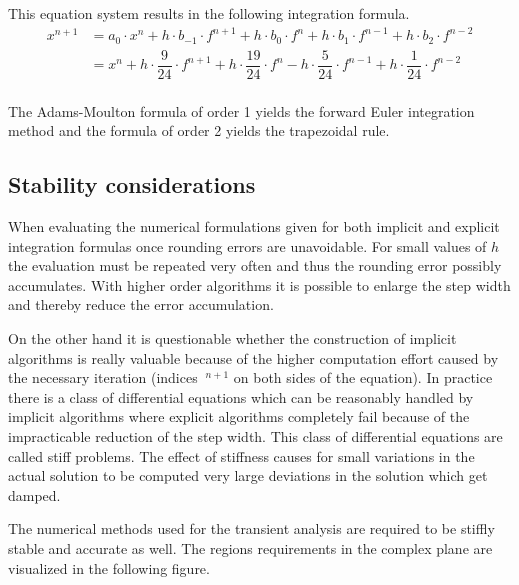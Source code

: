 This equation system results in the following integration formula.
\begin{equation}
\label{eq:MoultonInt}
\begin{split}
x^{n+1} &= a_0\cdot x^{n} + h\cdot b_{-1}\cdot f^{n+1} + h\cdot b_{0}\cdot f^{n} + h\cdot b_{1}\cdot f^{n-1} + h\cdot b_{2}\cdot f^{n-2}\\
&= x^{n} + h\cdot \dfrac{9}{24}\cdot f^{n+1} + h\cdot \dfrac{19}{24}\cdot f^{n} - h\cdot \dfrac{5}{24}\cdot f^{n-1} + h\cdot \dfrac{1}{24}\cdot f^{n-2}\\
\end{split}
\end{equation}

The Adams-Moulton formula of order 1 yields the forward Euler
integration method and the formula of order 2 yields the trapezoidal
rule.

\subsection{Stability considerations}

When evaluating the numerical formulations given for both implicit and
explicit integration formulas once rounding errors are unavoidable.
For small values of $h$ the evaluation must be repeated very often and
thus the rounding error possibly accumulates.  With higher order
algorithms it is possible to enlarge the step width and thereby reduce
the error accumulation.

\addvspace{12pt}

On the other hand it is questionable whether the construction of
implicit algorithms is really valuable because of the higher
computation effort caused by the necessary iteration (indices
$~^{n+1}$ on both sides of the equation).  In practice there is a class
of differential equations which can be reasonably handled by implicit
algorithms where explicit algorithms completely fail because of the
impracticable reduction of the step width.  This class of differential
equations are called stiff problems.  The effect of stiffness causes
for small variations in the actual solution to be computed very large
deviations in the solution which get damped.

\addvspace{12pt}

The numerical methods used for the transient analysis are required to
be stiffly stable and accurate as well.  The regions requirements in
the complex plane are visualized in the following figure.

